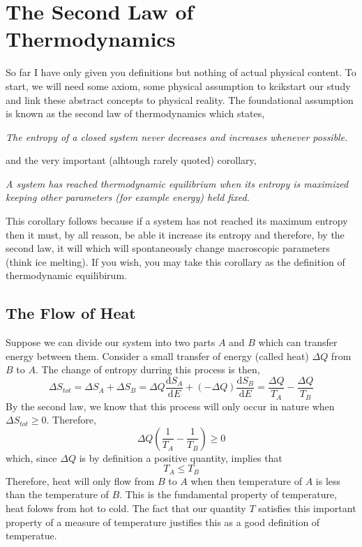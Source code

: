 \documentclass[11pt,a4paper]{article}
\renewcommand{\d}[1]{\mathrm{d}#1}
\newcommand{\deriv}[2]{\frac{\d{#1}}{\d{#2}}}
\theoremstyle{theorem}
\theoremstyle{definition}
\theoremstyle{definition}
\theoremstyle{remark}
\theoremstyle{definition}
\theoremstyle{remark}
\begin{document}
\section{The Second Law of Thermodynamics}

So far I have only given you definitions but nothing of actual physical content. To start, we will need some axiom, some physical assumption to kcikstart our study and link these abstract concepts to physical reality. The foundational assumption is known as the second law of thermodynamics which states,
\begin{center}
\textit{The entropy of a closed system never decreases and increases whenever possible.}
\end{center}
and the very important (alhtough rarely quoted) corollary,
\begin{center}
\textit{A system has reached thermodynamic equilibrium when its entropy is maximized keeping other parameters (for example energy) held fixed.} 
\end{center}
This corollary follows because if a system has not reached its maximum entropy then it must, by all reason, be able it increase its entropy and therefore, by the second law, it will which will spontaneously change macroscopic parameters (think ice melting). If you wish, you may take this corollary as the definition of thermodynamic equilibirum. 

\subsection{The Flow of Heat}

Suppose we can divide our system into two parts $A$ and $B$ which can transfer energy between them. Consider a small transfer of energy (called heat) $\Delta Q$ from $B$ to $A$. The change of entropy durring this process is then,
\[ \Delta S_{tot} = \Delta S_A + \Delta S_B = \Delta Q \deriv{S_A}{E} + (- \Delta Q) \deriv{S_B}{E} = \frac{\Delta Q}{T_A} - \frac{\Delta Q}{T_B} \]
By the second law, we know that this process will only occur in nature when $\Delta S_{tot} \ge 0$. Therefore,
\[ \Delta Q \left( \frac{1}{T_A} - \frac{1}{T_B} \right) \ge 0\]
which, since $\Delta Q$ is by definition a positive quantity, implies that 
\[ T_A \le T_B \]
Therefore, heat will only flow from $B$ to $A$ when then temperature of $A$ is less than the temperature of $B$. This is the fundamental property of temperature, heat folows from hot to cold. The fact that our quantity $T$ satisfies this important property of a measure of temperature justifies this as a good definition of temperatue.
\end{document}

